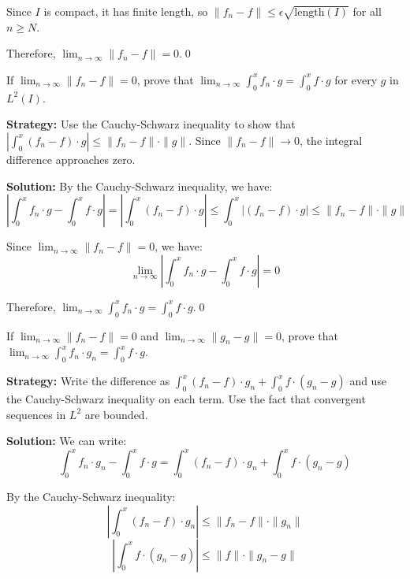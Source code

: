 Since $I$ is compact, it has finite length, so $\| f_n - f \| \leq \epsilon \sqrt{\text{length}(I)}$ for all $n \geq N$.

Therefore, $\lim_{n \to \infty} \| f_n - f \| = 0$.\qed


\begin{problembox}
\begin{problemstatement}
If $\lim_{n \to \infty} \| f_n - f \| = 0$, prove that $\lim_{n \to \infty} \int_0^x f_n \cdot g = \int_0^x f \cdot g$ for every $g$ in $L^2(I)$.
\end{problemstatement}
\end{problembox}

\noindent\textbf{Strategy:} Use the Cauchy-Schwarz inequality to show that $|\int_0^x (f_n - f) \cdot g| \leq \| f_n - f \| \cdot \| g \|$. Since $\| f_n - f \| \to 0$, the integral difference approaches zero.

\bigskip\noindent\textbf{Solution:}
By the Cauchy-Schwarz inequality, we have:
\[\left|\int_0^x f_n \cdot g - \int_0^x f \cdot g\right| = \left|\int_0^x (f_n - f) \cdot g\right| \leq \int_0^x |(f_n - f) \cdot g| \leq \| f_n - f \| \cdot \| g \|\]

Since $\lim_{n \to \infty} \| f_n - f \| = 0$, we have:
\[\lim_{n \to \infty} \left|\int_0^x f_n \cdot g - \int_0^x f \cdot g\right| = 0\]

Therefore, $\lim_{n \to \infty} \int_0^x f_n \cdot g = \int_0^x f \cdot g$.\qed


\begin{problembox}
\begin{problemstatement}
If $\lim_{n \to \infty} \| f_n - f \| = 0$ and $\lim_{n \to \infty} \| g_n - g \| = 0$, prove that $\lim_{n \to \infty} \int_0^x f_n \cdot g_n = \int_0^x f \cdot g$.
\end{problemstatement}
\end{problembox}

\noindent\textbf{Strategy:} Write the difference as $\int_0^x (f_n - f) \cdot g_n + \int_0^x f \cdot (g_n - g)$ and use the Cauchy-Schwarz inequality on each term. Use the fact that convergent sequences in $L^2$ are bounded.

\bigskip\noindent\textbf{Solution:}
We can write:
\[\int_0^x f_n \cdot g_n - \int_0^x f \cdot g = \int_0^x (f_n - f) \cdot g_n + \int_0^x f \cdot (g_n - g)\]

By the Cauchy-Schwarz inequality:
\[\left|\int_0^x (f_n - f) \cdot g_n\right| \leq \| f_n - f \| \cdot \| g_n \|\]
\[\left|\int_0^x f \cdot (g_n - g)\right| \leq \| f \| \cdot \| g_n - g \|\]


